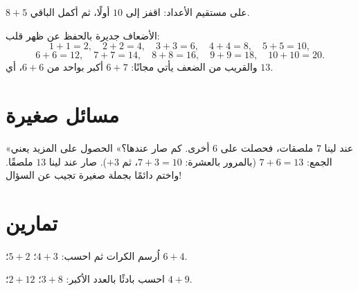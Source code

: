 \begin{omfigure}

{\small $8 + 5$ على مستقيم الأعداد: اقفز إلى $10$ أولًا، ثم أكمل الباقي.}
\end{omfigure}

\begin{example}[الأضعاف]\label{ex:g1:addition:doubles}
الأضعاف جديرة بالحفظ عن ظهر قلب:
\[
1+1=2, \quad 2+2=4, \quad 3+3=6, \quad 4+4=8, \quad 5+5=10,
\]
\[
6+6=12, \quad 7+7=14, \quad 8+8=16, \quad 9+9=18, \quad 10+10=20 .
\]
والقريب من الضعف يأتي مجانًا: $6 + 7$ أكبر بواحد من $6 + 6$، أي $13$.
\end{example}

\section{مسائل صغيرة}

\begin{example}\label{ex:g1:addition:problem}
«عند لينا $7$ ملصقات، فحصلت على $6$ أخرى. كم صار عندها؟»
الحصول على المزيد يعني الجمع: $7 + 6 = 13$ (بالمرور بالعشرة:
$7 + 3 = 10$، ثم $+3$). صار عند لينا $13$ ملصقًا. واختم دائمًا
بجملة صغيرة تجيب عن السؤال!
\end{example}

\section{تمارين}

\begin{exercise}[$\star$]\label{exo:g1:addition:1}
اُرسم الكرات ثم احسب: $4 + 3$؛ \quad $5 + 2$؛ \quad
$6 + 4$.
\end{exercise}

\begin{exercise}[$\star$]\label{exo:g1:addition:2}
احسب بادئًا بالعدد الأكبر: $3 + 8$؛ \quad
$2 + 12$؛ \quad $4 + 9$.
\end{exercise}

